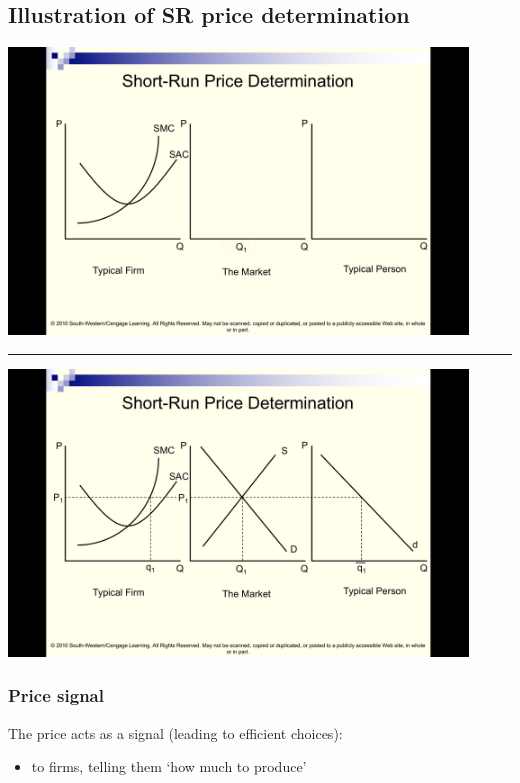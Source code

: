 \documentclass[]{article}
\providecommand{\tightlist}{%
  \setlength{\itemsep}{0pt}\setlength{\parskip}{0pt}}
\begin{document}
\hypertarget{illustration-of-sr-price-determination}{%
\subsection{Illustration of SR price
determination}\label{illustration-of-sr-price-determination}}

\includegraphics[height=3in]{picsfigs/srpd1.png}

\begin{center}\rule{0.5\linewidth}{\linethickness}\end{center}

\includegraphics[height=3in]{picsfigs/srpd6.png}

\hypertarget{price-signal}{%
\subsubsection{Price signal}\label{price-signal}}

The price acts as a signal (leading to efficient choices):

\begin{itemize}
\tightlist
\item
  to firms, telling them `how much to produce'
\end{itemize}
\end{document}

